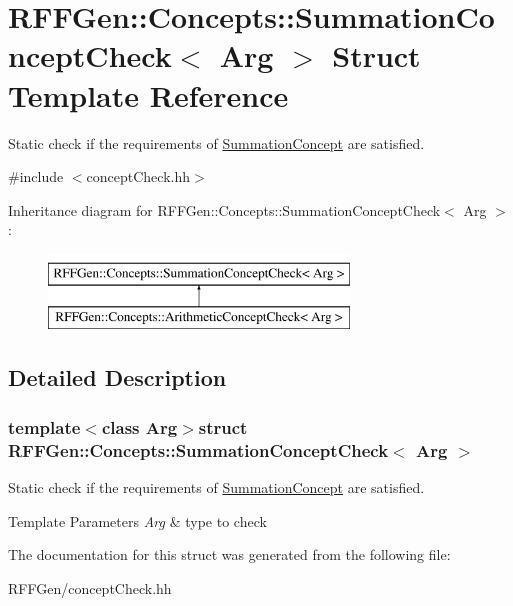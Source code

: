 \hypertarget{structRFFGen_1_1Concepts_1_1SummationConceptCheck}{\section{R\-F\-F\-Gen\-:\-:Concepts\-:\-:Summation\-Concept\-Check$<$ Arg $>$ Struct Template Reference}
\label{structRFFGen_1_1Concepts_1_1SummationConceptCheck}
}


Static check if the requirements of \hyperlink{structRFFGen_1_1Concepts_1_1SummationConcept}{Summation\-Concept} are satisfied.  




{\ttfamily \#include $<$concept\-Check.\-hh$>$}

Inheritance diagram for R\-F\-F\-Gen\-:\-:Concepts\-:\-:Summation\-Concept\-Check$<$ Arg $>$\-:\begin{figure}[H]
\begin{center}
\leavevmode
\includegraphics[height=2.000000cm]{structRFFGen_1_1Concepts_1_1SummationConceptCheck}
\end{center}
\end{figure}


\subsection{Detailed Description}
\subsubsection*{template$<$class Arg$>$struct R\-F\-F\-Gen\-::\-Concepts\-::\-Summation\-Concept\-Check$<$ Arg $>$}

Static check if the requirements of \hyperlink{structRFFGen_1_1Concepts_1_1SummationConcept}{Summation\-Concept} are satisfied. 


\begin{DoxyTemplParams}{Template Parameters}
{\em Arg} & type to check \\
\hline
\end{DoxyTemplParams}


The documentation for this struct was generated from the following file\-:\begin{DoxyCompactItemize}
\item 
R\-F\-F\-Gen/concept\-Check.\-hh\end{DoxyCompactItemize}

